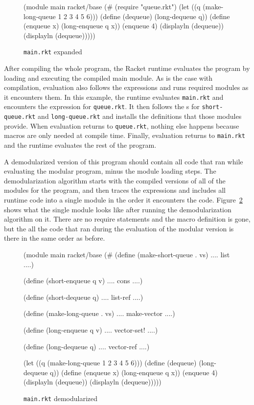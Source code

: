\documentclass[ms,electronic,letterpaper,lol,lof,lot]{byumsphd}
\begin{document}
\begin{figure}[h]
\begin{schemedisplay}
(module main racket/base
  (#%
   (require "queue.rkt")
   (let ((q (make-long-queue 1 2 3 4 5 6)))
     (define (dequeue) (long-dequeue q))
     (define (enqueue x) (long-enqueue q x))
     (enqueue 4)
     (displayln (dequeue))
     (displayln (dequeue)))))
\end{schemedisplay}
\caption{\texttt{main.rkt} expanded}
\label{main-expanded-rkt}
\end{figure}


After compiling the whole program, the Racket runtime evaluates the program by loading and executing the compiled main module.
As is the case with compilation, evaluation also follows the  expressions and runs required modules as it encounters them.
In this example, the runtime evaluates \texttt{main.rkt} and encounters the  expression for \texttt{queue.rkt}.
It then follows the s for \texttt{short-queue.rkt} and \texttt{long-queue.rkt} and installs the definitions that those modules provide.
When evaluation returns to \texttt{queue.rkt}, nothing else happens because macros are only needed at compile time.
Finally, evaluation returns to \texttt{main.rkt} and the runtime evaluates the rest of the program.

A demodularized version of this program should contain all code that ran while evaluating the modular program, minus the module loading steps.
The demodularization algorithm starts with the compiled versions of all of the modules for the program, and then traces the  expressions and includes all runtime code into a single module in the order it encounters the code.
Figure~\ref{main-demod-rkt} shows what the single module looks like after running the demodularization algorithm on it.
There are no require statements and the macro definition is gone, but the all the code that ran during the evaluation of the modular version is there in the same order as before.

\begin{figure}[h]
\begin{schemedisplay}
(module main racket/base
  (#%
   (define (make-short-queue . vs)
    .... list ....)

   (define (short-enqueue q v)
    .... cons ....)

   (define (short-dequeue q)
    .... list-ref ....)

   (define (make-long-queue . vs)
    .... make-vector ....)

   (define (long-enqueue q v)
    .... vector-set! ....)

   (define (long-dequeue q)
    .... vector-ref ....)

   (let ((q (make-long-queue 1 2 3 4 5 6)))
     (define (dequeue) (long-dequeue q))
     (define (enqueue x) (long-enqueue q x))
     (enqueue 4)
     (displayln (dequeue))
     (displayln (dequeue)))))
\end{schemedisplay}
\caption{\texttt{main.rkt} demodularized}
\label{main-demod-rkt}
\end{figure}
\end{document}
